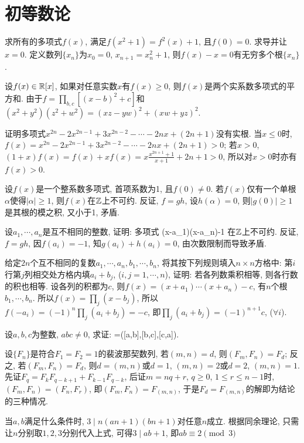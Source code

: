 \chapter{初等数论}
\bq{}{}
求所有的多项式$f(x)$, 满足$f(x^2+1)=f^2(x)+1$, 且$f(0)=0$.
\eq
\ba
求导并让$x=0$.
\ea
\ba
定义数列$\{x_n\}$为$x_0=0$, $x_{n+1}=x_{n}^2+1$, 则$f(x)-x=0$有无穷多个根$\{x_n\}$.
\ea

\bq{}{}
设$f(x)\in\Bbb R[x]$, 如果对任意实数$x$有$f(x)\ge0$, 则$f(x)$是两个实系数多项式的平方和.
\eq
\ba
由于$f=\prod_{b,c}\left[(x-b)^2+c\right]$和$(x^2+y^2)(z^2+w^2)=(xz-yw)^2+(xw+yz)^2$.
\ea

\bq{}{}
证明多项式$x^{2n}-2x^{2n-1}+3x^{2n-2}-\cdots-2nx+(2n+1)$没有实根.
\eq
\ba
当$x\le0$时, $f(x)=x^{2n}-2x^{2n-1}+3x^{2n-2}-\cdots-2nx+(2n+1)>0$; 若$x>0$, 
$(1+x)f(x)=f(x)+xf(x)=x\frac{x^{2n+1}+1}{x+1}+2n+1>0$, 所以对$x>0$时亦有$f(x)>0$.
\ea

\bq{}{}
设$f(x)$是一个整系数多项式, 首项系数为1, 且$f(0)\ne0$. 若$f(x)$仅有一个单根$\alpha$使得$|\alpha|\ge1$, 则$f(x)$在$\Bbb Z$上不可约.
\eq
\ba
反证, $f=gh$, 设$h(\alpha)=0$, 则$|g(0)|\ge1$是其根的模之积, 又小于1, 矛盾.
\ea

\bq{}{}
设$a_1,\cdots,a_n$是互不相同的整数, 证明: 多项式
\bee
(x-a_1)\cdots(x-a_n)-1
\eee
在$\Bbb Z$上不可约.
\eq
\ba
反证, $f=gh$, 因$f(a_i)=-1$, 知$g(a_i)+h(a_i)=0$, 由次数限制而导致矛盾.
\ea

\bq{}{}
给定$2n$个互不相同的复数$a_1, \cdots, a_n, b_1,\cdots, b_n$, 将其按下列规则填入$n\times n$方格中: 
第$i$行第$j$列相交处方格内填$a_i+b_j$, ($i,j=1,\cdots,n$), 证明: 若各列数乘积相等, 则各行数的积也相等.
\eq
\ba
设各列的积都为$c$, 则$f(x)=(x+a_1)\cdots(x+a_n)-c$, 有$n$个根$b_1,\cdots, b_n$.
所以$f(x)=\prod_{j}(x-b_j)$, 所以$f(-a_i)=(-1)^n\prod_{j}(a_{i}+b_j)=-c$,
即$\prod_j(a_i+b_j)=(-1)^{n+1}c$, ($\forall i$).
\ea

\bq{}{}
设$a,b,c$为整数, $abc\ne0$, 求证:
\bee
[(a,b),(b,c),(c,a)]=([a,b],[b,c],[c,a]).
\eee
\eq

\bq{}{}
设$\{F_n\}$是符合$F_1=F_2=1$的裴波那契数列, 若$(m,n)=d$, 则$(F_m,F_n)=F_d$;
反之, 若$(F_m, F_n)=F_d$, 则$d=(m,n)$或$d=1$, $(m,n)=2$或$d=2$, $(m,n)=1$.
\eq
\ba
先证$F_q=F_kF_{q-k+1}+F_{k-1}F_{q-k}$, 后证$m=nq+r$, $q\ge0$, $1\le r\le n-1$时, 
$(F_m,F_n)=(F_n,F_r)$, 即$(F_m,F_n)=F_{(m,n)}$, 于是$F_d=F_{(m,n)}$的解即为结论的三种情况.
\ea

\bq{}{}
当$a,b$满足什么条件时, $3\mid n(an+1)(bn+1)$对任意$n$成立.
\eq
\ba
根据同余理论, 只需让$n$分别取$1,2,3$分别代入上式, 可得$3\mid ab+1$, 即$ab\equiv 2\pmod 3$
\ea

